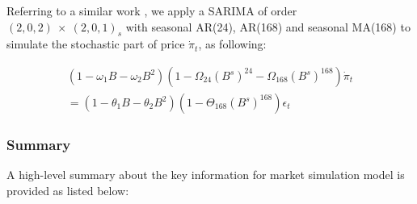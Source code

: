 Referring to a similar work \cite{Alipour2017}, we apply a SARIMA of order $(2,0,2)~\times~(2,0,1)_s$ with seasonal AR(24), AR(168) and seasonal MA(168) to simulate the stochastic part of price $\dot{\pi}_t$, as following:

\begin{multline*}
(1 - \omega _1 B - \omega _2 B^2 )(1 - \Omega _{24 }{(B^s)}^{24} - \Omega _{168 }{(B^s)}^{168}) \dot{\pi}_t \\
= (1- \theta _1 B - \theta _2 B^2) (1 - \Theta _{168} {(B^s)}^{168})\epsilon_t
\end{multline*}

\subsubsection{Summary}
A high-level summary about the key information for market simulation model is provided as listed below:
